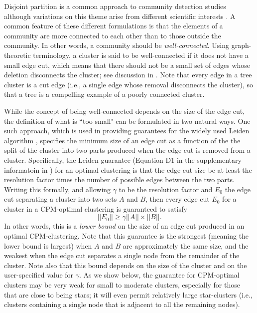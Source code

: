 \documentclass[a4paper]{article}   	%
\begin{document}
Disjoint partition is a  common approach to community detection studies \citep{Fortunato2022,Fortunato2010} although variations on this theme arise from different scientific interests \citep{Coscia2011,Schaub2017}.
A common feature of these different formulations is that  the elements of a community are more connected to each other than to those outside the community. In other words, a community
should be {\em well-connected}. Using graph-theoretic terminology, a cluster is said to be well-connected if it does not have a small edge cut, which means that there should not be a small set of edges whose deletion
disconnects the cluster; see discussion in \cite{Traag_2019}.
Note that every edge in  a tree cluster is a cut edge (i.e., a single edge whose removal disconnects the cluster), so that a tree is  a compelling example of a poorly connected cluster.

While the concept of being well-connected depends on the size of the edge cut, the definition of what is ``too small" can be formulated in two
natural ways.
One such  approach, which is used in providing guarantees for the widely used Leiden algorithm \citep{Traag_2019}, specifies the minimum size of an edge cut as a function of the the split  of the cluster into two parts produced
when the edge cut is removed from a cluster.
Specifically, the Leiden guarantee  (Equation D1 in the supplementary informatoin in \cite{Traag_2019}) for an optimal clustering  is that the edge cut size be at least the resolution factor   times the number of possible edges between the two  parts. Writing this formally, and allowing $\gamma$ to be the resolution factor and $E_0$ the edge cut
separating a cluster into two sets $A$ and $B$,  then every edge cut $E_0$ for a cluster in a CPM-optimal clustering is guaranteed to satisfy $$||E_0|| \geq \gamma ||A|| \times ||B||.$$
In other words, this is a {\em lower bound} on the size of an edge cut produced in an optimal CPM-clustering.
Note  that this guarantee is the strongest (meaning the lower bound is largest) when $A$ and $B$ are approximately the same size, and the weakest when the
edge cut separates a single node from the remainder of the cluster.
Note also that this bound depends on the size of the cluster and on   the user-specified value for $\gamma$.
As we show below, the guarantee for CPM-optimal clusters may be very weak for small to moderate clusters, especially for those that are close to being
stars; it will even permit relatively large star-clusters (i.e., clusters containing a single node that is adjacent to all the remaining nodes).
\end{document}
